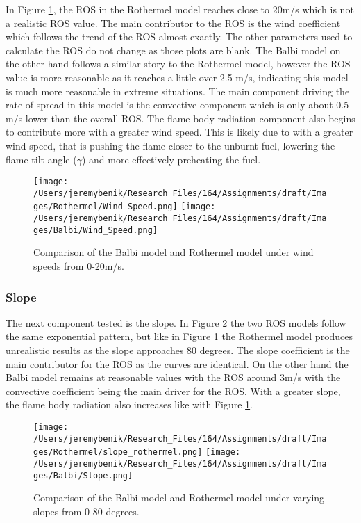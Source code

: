 \documentclass{article}
\begin{document}
\indent In Figure \ref{Wind Speed}, the ROS in the Rothermel model reaches close to 20m/s which is not a realistic ROS value. The main contributor to the ROS is the wind coefficient which follows the trend of the ROS almost exactly. The other parameters used to calculate the ROS do not change as those plots are blank. The Balbi model on the other hand follows a similar story to the Rothermel model, however the ROS value is more reasonable as it reaches a little over 2.5 m/s, indicating this model is much more reasonable in extreme situations. The main component driving the rate of spread in this model is the convective component which is only about 0.5 m/s lower than the overall ROS. The flame body radiation component also begins to contribute more with a greater wind speed. This is likely due to with a greater wind speed, that is pushing the flame closer to the unburnt fuel, lowering the flame tilt angle ($\gamma$) and more effectively preheating the fuel. 
\newpage
\begin{figure}[!h]
\centering
  \texttt{[image: /Users/jeremybenik/Research\_Files/164/Assignments/draft/Images/Rothermel/Wind\_Speed.png]}
  \texttt{[image: /Users/jeremybenik/Research\_Files/164/Assignments/draft/Images/Balbi/Wind\_Speed.png]}
  \caption{Comparison of the Balbi model and Rothermel model under wind speeds from 0-20m/s.}
  \label{Wind Speed}
\end{figure}
\subsubsection{Slope}

\indent The next component tested is the slope. In Figure \ref{Slope} the two ROS models follow the same exponential pattern, but like in Figure \ref{Wind Speed} the Rothermel model produces unrealistic results as the slope approaches 80 degrees. The slope coefficient is the main contributor for the ROS as the curves are identical. On the other hand the Balbi model remains at reasonable values with the ROS around 3m/s with the convective coefficient being the main driver for the ROS. With a greater slope, the flame body radiation also increases like with Figure \ref{Wind Speed}. 
\newpage
\begin{figure}[!h]
\centering
  \texttt{[image: /Users/jeremybenik/Research\_Files/164/Assignments/draft/Images/Rothermel/slope\_rothermel.png]}
  \texttt{[image: /Users/jeremybenik/Research\_Files/164/Assignments/draft/Images/Balbi/Slope.png]}
  \caption{Comparison of the Balbi model and Rothermel model under varying slopes from 0-80 degrees.}
  \label{Slope}
\end{figure}
\end{document}

